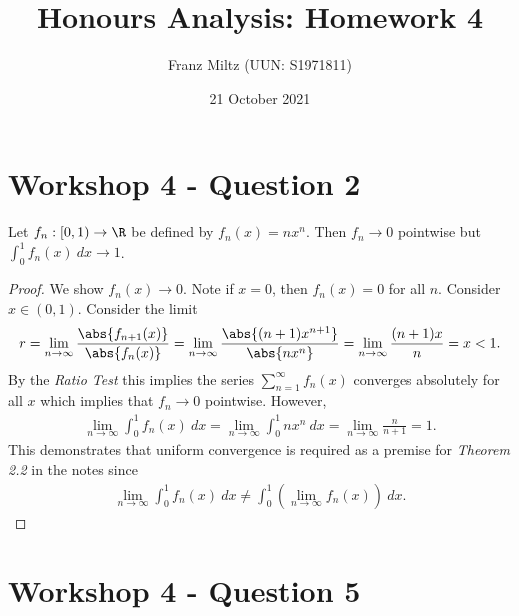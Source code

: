 \documentclass{article}
\begin{document}
\title{Honours Analysis: Homework 4}
\author{Franz Miltz (UUN: S1971811)}
\date{21 October 2021}
\maketitle

\section*{Workshop 4 - Question 2}

\begin{claim*}
	Let $f_n:\left[0,1\right)\to\R$ be defined by $f_n(x)=nx^n$.
	Then $f_n\to 0$ pointwise but $\int_0^1 f_n(x)\:dx\to 1$.
\end{claim*}

\begin{proof}
	We show $f_n(x)\to 0$.
	Note if $x=0$, then $f_n(x)=0$ for all $n$. Consider $x\in(0,1)$.
	Consider the limit
	\begin{align*}
		r = \lim_{n\to\infty} \frac{\abs{f_{n+1}(x)}}{\abs{f_n(x)}}
		= \lim_{n\to\infty}\frac{\abs{(n+1)x^{n+1}}}{\abs{nx^n}}
		= \lim_{n\to\infty}\frac{(n+1)x}{n} = x < 1.
	\end{align*}
	By the \emph{Ratio Test} this implies the series $\sum_{n=1}^\infty
		f_n(x)$ converges absolutely for all $x$ which implies that
	$f_n\to 0$ pointwise. However,
	\begin{align*}
		\lim_{n\to\infty} \int_0^1 f_n(x)\:dx
		= \lim_{n\to\infty}\int_0^1 nx^n\:dx
		= \lim_{n\to\infty}\frac{n}{n+1} = 1.
	\end{align*}
	This demonstrates that uniform convergence is required as a premise for
	\emph{Theorem 2.2} in the notes since
	\begin{align*}
		\lim_{n\to\infty} \int_0^1 f_n(x)\:dx
		\not = \int_0^1\left(\lim_{n\to\infty} f_n(x)\right)\:dx.
	\end{align*}
\end{proof}

\section*{Workshop 4 - Question 5}
\end{document}
